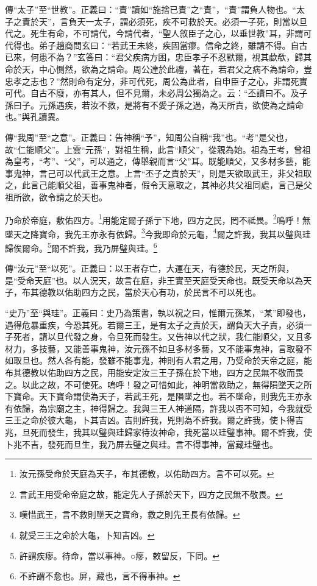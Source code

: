 {\noindent\zhuan{}\fzbyks 傳“太子”至“世教”。正義曰：“責”讀如“施捨已責”之“責”，“責”謂負人物也。“太子之責於天”，言負天一太子，謂必須死，疾不可救於天。必須一子死，則當以旦代之。死生有命，不可請代，今請代者，“聖人敘臣子之心，以垂世教”耳，非謂可代得也。弟子趙商問玄曰：“若武王未終，疾固當瘳。信命之終，雖請不得。自古已來，何患不為？”玄答曰：“君父疾病方困，忠臣孝子不忍默爾，視其歔欷，歸其命於天，中心惻然，欲為之請命。周公達於此禮，著在，若君父之病不為請命，豈忠孝之志也？”然則命有定分，非可代死，周公為此者，自申臣子之心，非謂死實可代。自古不廢，亦有其人，但不見爾，未必周公獨為之。云：“丕讀曰不。及子孫曰子。元孫遇疾，若汝不救，是將有不愛子孫之過，為天所責，欲使為之請命也。”與孔讀異。 \par}

{\noindent\zhuan{}\fzbyks 傳“我周”至“之意”。正義曰：告神稱“予”，知周公自稱“我”也。“考”是父也，故“仁能順父”。上雲“元孫”，對祖生稱，此言“順父”，從親為始。祖為王考，曾祖為皇考，“考”、“父”，可以通之，傳舉親而言“父”耳。既能順父，又多材多藝，能事鬼神，言己可以代武王之意。上言“丕子之責於天”，則是天欲取武王，非父祖取之，此言己能順父祖，善事鬼神者，假令天意取之，其神必共父祖同處，言己是父祖所欲，欲令請之於天也。 \par}

乃命於帝庭，敷佑四方。\footnote{汝元孫受命於天庭為天子，布其德教，以佑助四方。言不可以死。}用能定爾子孫亍下地，四方之民，罔不祗畏。\footnote{言武王用受命帝庭之故，能定先人子孫於天下，四方之民無不敬畏。}嗚呼！無墜天之降寶命，我先王亦永有依歸。\footnote{嘆惜武王，言不救則墜天之寶命，救之則先王長有依歸。}今我即命於元龜，\footnote{就受三王之命於大龜，卜知吉凶。}爾之許我，我其以璧與珪歸俟爾命。\footnote{許謂疾瘳。待命，當以事神。○瘳，敕留反，下同。}爾不許我，我乃屏璧與珪。\footnote{不許謂不愈也。屏，藏也，言不得事神。}

{\noindent\zhuan{}\fzbyks 傳“汝元”至“以死”。正義曰：以王者存亡，大運在天，有德於民，天之所與，是“受命天庭”也。以人況天，故言在庭，非王實至天庭受天命也。既受天命以為天子，布其德教以佑助四方之民，當於天心有功，於民言不可以死也。 \par}

{\noindent\shu{}\fzkt “史乃”至“與珪”。正義曰：史乃為策書，執以祝之曰，惟爾元孫某，“某”即發也，遇得危暴重疾，今恐其死。若爾三王，是有太子之責於天，謂負天大子責，必須一子死者，請以旦代發之身，令旦死而發生。又告神以代之狀，我仁能順父，又且多材力，多技藝，又能善事鬼神，汝元孫不如旦多材多藝，又不能事鬼神，言取發不如取旦也。然人各有能，發雖不能事鬼，神則有人君之用，乃受命於天帝之庭，能布其德教以佑助四方之民，用能安定汝三王子孫在於下地，四方之民無不敬而畏之。以此之故，不可使死。嗚呼！發之可惜如此，神明當救助之，無得隕墜天之所下寶命。天下寶命謂使為天子，若武王死，是隕墜之也。若不墜命，則我先王亦永有依歸，為宗廟之主，神得歸之。我與三王人神道隔，許我以否不可知，今我就受三王之命於彼大龜，卜其吉凶。吉則許我，兇則為不許我。爾之許我，使卜得吉兆，旦死而發生，我其以璧與珪歸家待汝神命，我死當以珪璧事神。爾不許我，使卜兆不吉，發死而旦生，我乃屏去璧之與珪。言不得事神，當藏珪璧也。 \par}


